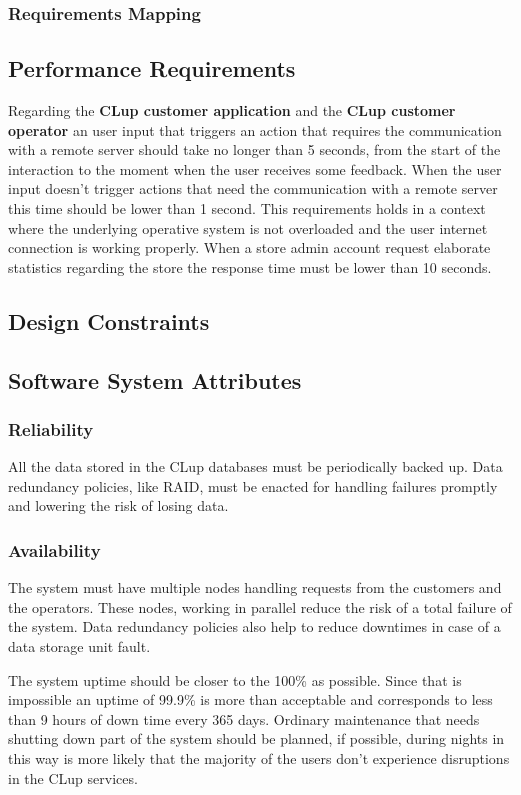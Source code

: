 \subsubsection{Requirements Mapping}
\subsection{Performance Requirements}
Regarding the \textbf{CLup customer application} and the \textbf{CLup customer operator}  an user input that triggers an action that requires the communication with a remote server should take no longer than 5 seconds, from the start of the interaction to the moment when the user receives some feedback. When the user input doesn't trigger actions that need the communication with a remote server this time should be lower than 1 second. This requirements holds in a context where the underlying operative system is not overloaded and the user internet connection is working properly.
\smallskip
When a store admin account request elaborate statistics regarding the store the response time must be lower than 10 seconds.
\subsection{Design Constraints}
\subsection{Software System Attributes}
\subsubsection{Reliability}
All the data stored in the CLup databases must be periodically backed up. Data redundancy policies, like RAID, must be enacted for handling failures promptly and lowering the risk of losing data.

\subsubsection{Availability}
The system must have multiple nodes handling requests from the customers and the operators. These nodes, working in parallel reduce the risk of a total failure of the system. Data redundancy policies also help to reduce downtimes in case of a data storage unit fault.

\smallskip

The system uptime should be closer to the 100\% as possible. Since that is impossible an uptime of 99.9\% is more than acceptable and corresponds to less than 9 hours of down time every 365 days.
Ordinary maintenance that needs shutting down part of the system should be planned, if possible, during nights in this way is more likely that the majority of the users don't experience disruptions in the CLup services.

